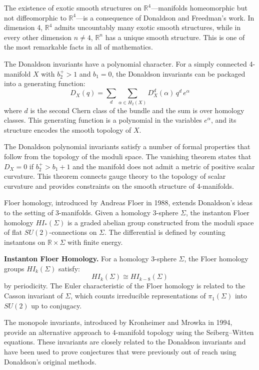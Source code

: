 The existence of exotic smooth structures on $\mathbb{R}^4$---manifolds homeomorphic but not diffeomorphic to $\mathbb{R}^4$---is a consequence of Donaldson and Freedman's work. In dimension 4, $\mathbb{R}^4$ admits uncountably many exotic smooth structures, while in every other dimension $n \neq 4$, $\mathbb{R}^n$ has a unique smooth structure. This is one of the most remarkable facts in all of mathematics.

The Donaldson invariants have a polynomial character. For a simply connected 4-manifold $X$ with $b_2^+ > 1$ and $b_1 = 0$, the Donaldson invariants can be packaged into a generating function:
\[
D_X(q) = \sum_{d} \sum_{\alpha \in H_2(X)} D_X^d(\alpha) \, q^d \, e^\alpha
\]
where $d$ is the second Chern class of the bundle and the sum is over homology classes. This generating function is a polynomial in the variables $e^\alpha$, and its structure encodes the smooth topology of $X$.

The Donaldson polynomial invariants satisfy a number of formal properties that follow from the topology of the moduli space. The vanishing theorem states that $D_X = 0$ if $b_2^+ > b_1 + 1$ and the manifold does not admit a metric of positive scalar curvature. This theorem connects gauge theory to the topology of scalar curvature and provides constraints on the smooth structure of 4-manifolds.

Floer homology, introduced by Andreas Floer in 1988, extends Donaldson's ideas to the setting of 3-manifolds. Given a homology 3-sphere $\Sigma$, the instanton Floer homology $HI_*(\Sigma)$ is a graded abelian group constructed from the moduli space of flat $SU(2)$-connections on $\Sigma$. The differential is defined by counting instantons on $\mathbb{R} \times \Sigma$ with finite energy.

\textbf{Instanton Floer Homology.} For a homology 3-sphere $\Sigma$, the Floer homology groups $HI_k(\Sigma)$ satisfy:
\[
HI_k(\Sigma) \cong HI_{k-8}(\Sigma)
\]
by periodicity. The Euler characteristic of the Floer homology is related to the Casson invariant of $\Sigma$, which counts irreducible representations of $\pi_1(\Sigma)$ into $SU(2)$ up to conjugacy.

The monopole invariants, introduced by Kronheimer and Mrowka in 1994, provide an alternative approach to 4-manifold topology using the Seiberg--Witten equations. These invariants are closely related to the Donaldson invariants and have been used to prove conjectures that were previously out of reach using Donaldson's original methods.

